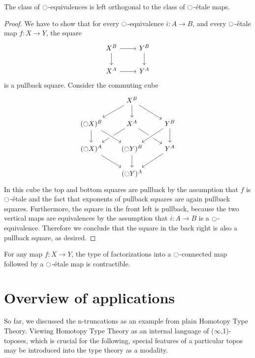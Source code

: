 \documentclass[9pt,twosided]{amsart}
\begin{document}
\begin{lem}\label{lem:rfs_orthogonal}
The class of ${\ocircle}$-equivalences is left orthogonal to the class of ${\ocircle}$-\'etale maps.
\end{lem}

\begin{proof}
We have to show that for every ${\ocircle}$-equivalence $i:A\to B$, and every ${\ocircle}$-\'etale map $f:X\to Y$, the square
\begin{equation*}
\begin{tikzcd}
X^B \arrow[r] \arrow[d] & Y^B \arrow[d] \\
X^A \arrow[r] & Y^A
\end{tikzcd}
\end{equation*}
is a pullback square. Consider the commuting cube
\begin{equation*}
\begin{tikzcd}
&[-1ex] X^B \arrow[dl] \arrow[d] \arrow[dr] \\
(\modal X)^B \arrow[d] & X^A \arrow[dl] \arrow[dr] & Y^B \arrow[d] \arrow[dl,crossing over] \\
(\modal X)^A \arrow[dr] & (\modal Y)^B \arrow[from=ul,crossing over] \arrow[d] & Y^A \arrow[dl] \\
& (\modal Y)^A
\end{tikzcd}
\end{equation*}
In this cube the top and bottom squares are pullback by the assumption that $f$ is ${\ocircle}$-\'etale and the fact that exponents of pullback squares are again pullback squares. Furthermore, the square in the front left is pullback, because the two vertical maps are equivalences by the assumption that $i:A\to B$ is a ${\ocircle}$-equivalence. Therefore we conclude that the square in the back right is also a pullback square, as desired.
\end{proof}

\begin{cor}
For any map $f:X\to Y$, the type of factorizations into a ${\ocircle}$-connected map followed by a ${\ocircle}$-\'etale map is contractible.
\end{cor}

\section{Overview of applications}

So far, we discussed the n-truncations as an example from plain Homotopy Type Theory.
Viewing Homotopy Type Theory as an internal language of ($\infty$,1)-toposes, 
which is crucial for the following,
special features of a particular topos may be introduced into the type theory as a modality.
\end{document}
